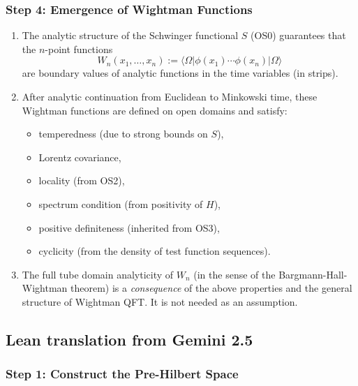 \documentclass{article}
\begin{document}
\subsubsection*{Step 4: Emergence of Wightman Functions}

\begin{enumerate}
  \item The analytic structure of the Schwinger functional $S$ (OS0) guarantees that the $n$-point functions
  \[
  W_n(x_1, \dots, x_n) := \langle \Omega | \phi(x_1) \cdots \phi(x_n) | \Omega \rangle
  \]
  are boundary values of analytic functions in the time variables (in strips).

  \item After analytic continuation from Euclidean to Minkowski time, these Wightman functions are defined on open domains and satisfy:
  \begin{itemize}
    \item temperedness (due to strong bounds on $S$),
    \item Lorentz covariance,
    \item locality (from OS2),
    \item spectrum condition (from positivity of $H$),
    \item positive definiteness (inherited from OS3),
    \item cyclicity (from the density of test function sequences).
  \end{itemize}

  \item The full tube domain analyticity of $W_n$ (in the sense of the Bargmann-Hall-Wightman theorem) is a \emph{consequence} of the above properties and the general structure of Wightman QFT. It is not needed as an assumption.
\end{enumerate}

\subsection{Lean translation from Gemini 2.5}

\subsubsection*{Step 1: Construct the Pre-Hilbert Space}
\end{document}
